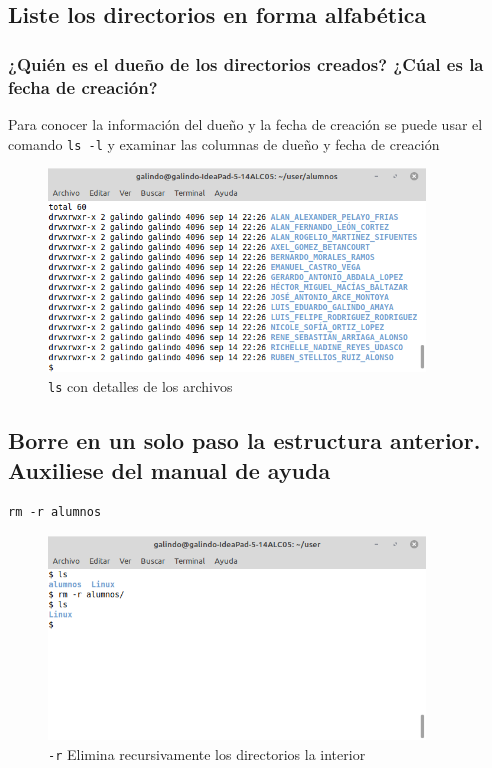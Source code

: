 \documentclass[11pt]{article}
\begin{document}
\subsection{Liste los directorios en forma alfabética}
\label{sec:org312f3bc}
\subsubsection*{¿Quién es el dueño de los directorios creados? ¿Cúal es la fecha de creación?}
\label{sec:orgfa369e3}
\begin{mdframed}
Para conocer la información del dueño y la fecha de creación se puede usar el
comando \texttt{ls -l} y examinar las columnas de dueño y fecha de creación 
\end{mdframed}

\begin{figure}[htbp]
\centering
\includegraphics[width=10cm]{img/13a.png}
\caption[\texttt{ls}]{\texttt{ls} con detalles de los archivos}
\end{figure}

\subsection{Borre en un solo paso la estructura anterior. Auxiliese del manual de ayuda}
\label{sec:org6ebc893}
\begin{verbatim}
rm -r alumnos
\end{verbatim}

\begin{figure}[htbp]
\centering
\includegraphics[width=10cm]{img/14.png}
\caption[\texttt{-r}]{\texttt{-r} Elimina recursivamente los directorios la interior}
\end{figure}
\end{document}
